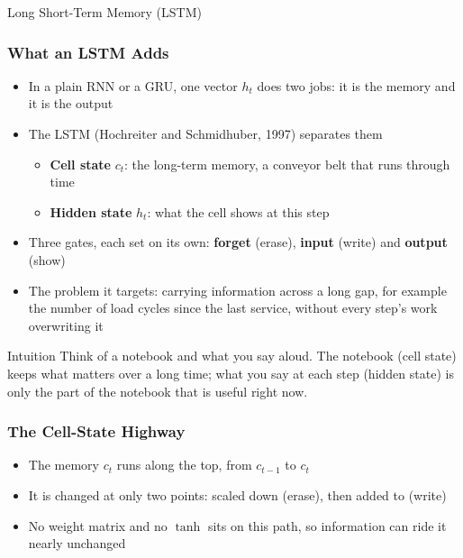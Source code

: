 \begin{frame}
  \begin{center}
    {\Large Long Short-Term Memory (LSTM)}
  \end{center}
\end{frame}


\begin{frame}[fragile] \frametitle{What an LSTM Adds}
\begin{itemize}
\item In a plain RNN or a GRU, one vector $h_t$ does two jobs: it is the memory and it is the output
\item The LSTM (Hochreiter and Schmidhuber, 1997) separates them
  \begin{itemize}
  \item \textbf{Cell state} $c_t$: the long-term memory, a conveyor belt that runs through time
  \item \textbf{Hidden state} $h_t$: what the cell shows at this step
  \end{itemize}
\item Three gates, each set on its own: \textbf{forget} (erase), \textbf{input} (write) and \textbf{output} (show)
\item The problem it targets: carrying information across a long gap, for example the number of load cycles since the last service, without every step's work overwriting it
\end{itemize}
\begin{block}{Intuition}
Think of a notebook and what you say aloud. The notebook (cell state) keeps what matters over a long time; what you say at each step (hidden state) is only the part of the notebook that is useful right now.
\end{block}
\end{frame}


\begin{frame}[fragile] \frametitle{The Cell-State Highway}
\begin{center}
\end{center}
\begin{itemize}
\item The memory $c_t$ runs along the top, from $c_{t-1}$ to $c_t$
\item It is changed at only two points: scaled down (erase), then added to (write)
\item No weight matrix and no $\tanh$ sits on this path, so information can ride it nearly unchanged
\end{itemize}
\end{frame}


